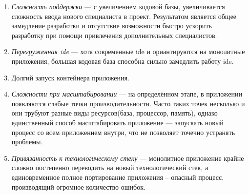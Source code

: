 \begin{enumerate}
	\item \textit{Сложность поддержки} --- с увеличением кодовой базы, увеличивается сложность ввода нового специалиста в проект. Результатом является общее замедление разработки и отсутствие возможности быстро ускорить разработку при помощи привлечения дополнительных специалистов.
	\item \textit{Перегруженная \gls{ide}} --- хотя современные \gls{ide} и ориантируются на монолитные приложения, большая кодовая база способна сильно замедлить работу \gls{ide}.
	\item Долгий запуск контейнера приложения.
	\item \textit{Сложности при масштабировании} --- на определённом этапе, в приложении появляются слабые точки производительности. Часто таких точек несколько и они трубуют разные виды ресурсов(база, процессор, память), однако единственный способ масштабировать приложение --- запускать новый процесс со всем приложением внутри, что не позволяет точечно устранять проблемы.
	\item \textit{Привязанность к технологическому стеку} --- монолитное приложение крайне сложно постепенно переводить на новый технологический стек, а единовременное полное портирование приложения -- опасный процесс, производящий огромное количество ошибок.
\end{enumerate}